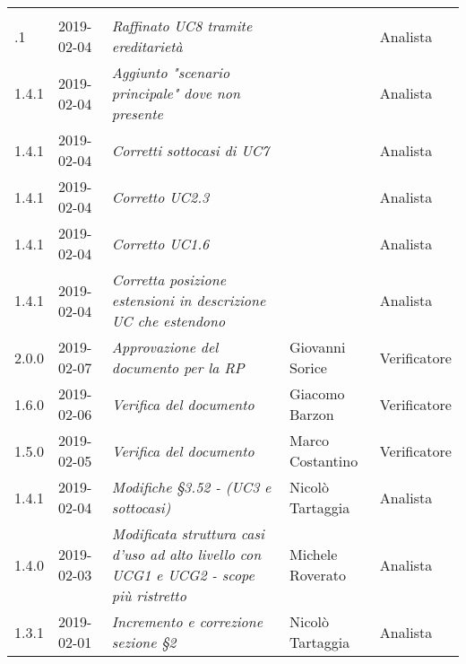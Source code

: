 \newpage 
\section*{}
	\begin{longtable}{C{2cm}|C{2.5cm}|C{4.5cm}|C{2.5cm}|C{3cm}}

	 &  &  &  &   \\
	.1 & 2019-02-04 & \emph{Raffinato UC8 tramite ereditarietà} &  & Analista \\
		\hline
	
		1.4.1 & 2019-02-04 & \emph{Aggiunto "scenario principale" dove non presente} &  & Analista \\
		\hline
	
		1.4.1 & 2019-02-04 & \emph{Corretti sottocasi di UC7} &  & Analista \\
		\hline
	
		1.4.1 & 2019-02-04 & \emph{Corretto UC2.3} &  & Analista \\
		\hline
		
		1.4.1 & 2019-02-04 & \emph{Corretto UC1.6} &  & Analista \\
		\hline
	
	    1.4.1 & 2019-02-04 & \emph{Corretta posizione estensioni in descrizione UC che estendono} &  & Analista \\
	    \hline
	
		2.0.0 & 2019-02-07 & \emph{Approvazione del documento per la RP} & Giovanni Sorice & Verificatore \\
		\hline
	
		1.6.0 & 2019-02-06 & \emph{Verifica del documento} & Giacomo Barzon & Verificatore \\
		\hline
		
		1.5.0 & 2019-02-05 & \emph{Verifica del documento} & Marco Costantino & Verificatore \\
		\hline
	
		1.4.1 & 2019-02-04 & \emph{Modifiche §3.52 -  (UC3 e sottocasi)} & Nicolò Tartaggia & Analista \\
		\hline
	
		1.4.0 & 2019-02-03 & \emph{Modificata struttura casi d'uso ad alto livello con UCG1 e UCG2 - scope più ristretto} & Michele Roverato & Analista \\
		\hline
	
		1.3.1 & 2019-02-01 & \emph{Incremento e correzione sezione §2} & Nicolò Tartaggia & Analista \\
		\hline
	

\end{longtable}
